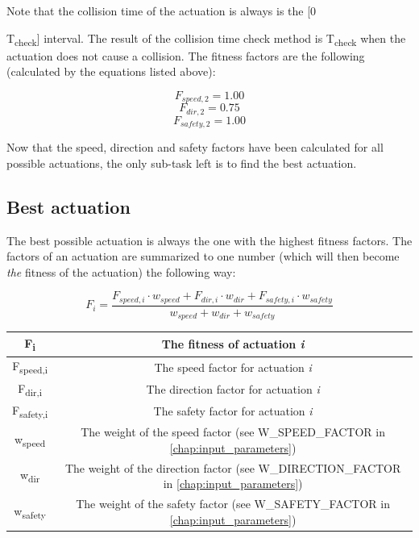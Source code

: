 Note that the collision time of the actuation is always is the [0 {T\textsubscript{check}] interval. The result of the collision time check method is T\textsubscript{check} when the actuation does not cause a collision. The fitness factors are the following (calculated by the equations listed above):

\[ F_{speed,2} = 1.00 \]
\[ F_{dir,2} = 0.75 \]
\[ F_{safety,2} = 1.00 \]

Now that the speed, direction and safety factors have been calculated for all possible actuations, the only sub-task left is to find the best actuation.

\begin{minipage}{\textwidth}
\subsection{Best actuation}

The best possible actuation is always the one with the highest fitness factors. The factors of an actuation are summarized to one number (which will then become \textit{the} fitness of the actuation) the following way:

\[ F_{i} = \frac{F_{speed,i} \cdot w_{speed} + F_{dir,i} \cdot w_{dir} + F_{safety,i} \cdot w_{safety}}{w_{speed} + w_{dir} + w_{safety}} \]
\end{minipage}

\begin{center}
    \begin{tabular}{ | c | c | }
        \hline
        F\textsubscript{i}  		& The fitness of actuation \textit{i}															\\
        \hline
        F\textsubscript{speed,i}  	& The speed factor for actuation \textit{i}														\\
        \hline
        F\textsubscript{dir,i}  	& The direction factor for actuation \textit{i}													\\
        \hline
        F\textsubscript{safety,i}  	& The safety factor for actuation \textit{i}													\\
        \hline
        w\textsubscript{speed}  	& The weight of the speed factor (see W\_SPEED\_FACTOR in \ref{chap:input_parameters})			\\
        \hline
        w\textsubscript{dir}  		& The weight of the direction factor (see W\_DIRECTION\_FACTOR in \ref{chap:input_parameters})	\\
        \hline
        w\textsubscript{safety}  	& The weight of the safety factor (see W\_SAFETY\_FACTOR in \ref{chap:input_parameters})		\\
        \hline
    \end{tabular}
\end{center}

}
